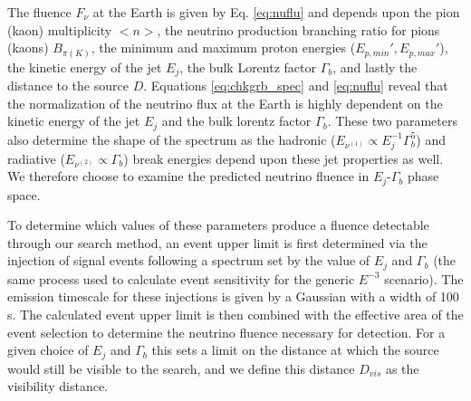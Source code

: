 \documentclass[manuscript]{aastex}
\begin{document}
The fluence $F_\nu$ at the Earth is given by Eq. \ref{eq:nuflu} and depends upon the pion (kaon) multiplicity $<n>$, the neutrino production branching ratio for pions (kaons) $B_{\pi(K)}$, the minimum and maximum proton energies ($E_{p,min}', E_{p,max}'$), the kinetic energy of the jet $E_j$, the bulk Lorentz factor $\Gamma_b$, and lastly the distance to the source $D$. Equations \ref{eq:chkgrb_spec} and \ref{eq:nuflu} reveal that the normalization of the neutrino flux at the Earth is highly dependent on the kinetic energy of the jet $E_j$ and the bulk lorentz factor $\Gamma_b$. These two parameters also determine the shape of the spectrum as the hadronic ($E_{\nu^{(1)}}\propto E_j^{-1} \Gamma_b^5$) and radiative ($E_{\nu^{(2)}}\propto \Gamma_b$) break energies depend upon these jet properties as well. We therefore choose to examine the predicted neutrino fluence in $E_j$-$\Gamma_b$ phase space. 

To determine which values of these parameters produce a fluence detectable through our search method, an event upper limit is first determined via the injection of signal events following a spectrum set by the value of $E_j$ and $\Gamma_b$ (the same process used to calculate event sensitivity for the generic $E^{-3}$ scenario). The emission timescale for these injections is given by a Gaussian with a width of 100\,s. The calculated event upper limit is then combined with the effective area of the event selection to determine the neutrino fluence necessary for detection. For a given choice of $E_j$ and $\Gamma_b$ this sets a limit on the distance at which the source would still be visible to the search, and we define this distance $D_{vis}$ as the visibility distance.
\end{document}
